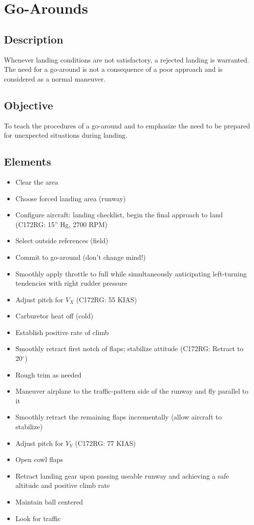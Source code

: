 \section{Go-Arounds}

\subsection{Description}

Whenever landing conditions are not satisfactory, a rejected landing is
warranted. The need for a go-around is not a consequence of a poor approach and
is considered as a normal maneuver.

\subsection{Objective}

To teach the procedures of a go-around and to emphasize the need to be prepared
for unexpected situations during landing.

\subsection{Elements}

\begin{itemize}
  \item Clear the area
  \item Choose forced landing area (runway)
  \item Configure aircraft: landing checklist, begin the final approach to land
    (C172RG: 15'' Hg, 2700 RPM)
  \item Select outside references (field)
  \item Commit to go-around (don't change mind!) 
  \item Smoothly apply throttle to full while simultaneously anticipating
    left-turning tendencies with right rudder pressure 
  \item Adjust pitch for $V_X$ (C172RG: 55 KIAS)
  \item Carburetor heat off (cold) 
  \item Establish positive rate of climb
  \item Smoothly retract first notch of flaps; stabilize attitude (C172RG:
    Retract to 20$^\circ$)
  \item Rough trim as needed
  \item Maneuver airplane to the traffic-pattern side of the runway and fly
    parallel to it
  \item Smoothly retract the remaining flaps incrementally (allow aircraft to
    stabilize)
  \item Adjust pitch for $V_Y$ (C172RG: 77 KIAS)
  \item Open cowl flaps 
  \item Retract landing gear upon passing useable runway and achieving a safe
    altitude and positive climb rate
  \item Maintain ball centered
  \item Look for traffic
\end{itemize}

